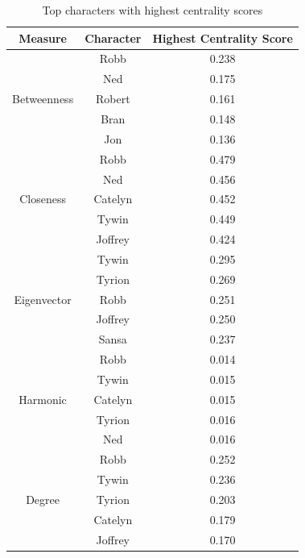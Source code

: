 \documentclass[10pt,twocolumn,letterpaper]{article}
\begin{document}
\begin{table}[!h]
    \centering
    \small
    \begin{tabular}{c|c|c}
        Measure & Character & \small{Highest Centrality Score} \\
        \hline
                    & Robb & 0.238 \\
                    & Ned & 0.175 \\
        Betweenness & Robert & 0.161 \\
                    & Bran & 0.148 \\
                    & Jon & 0.136 \\
        \hline 
                    & Robb & 0.479 \\
                    & Ned & 0.456 \\
        Closeness   & Catelyn & 0.452 \\
                    & Tywin & 0.449 \\
                    & Joffrey & 0.424 \\
        \hline 
                    & Tywin & 0.295 \\
                    & Tyrion & 0.269 \\
        Eigenvector & Robb & 0.251 \\
                    & Joffrey & 0.250 \\
                    & Sansa & 0.237 \\
        \hline 
                    & Robb & 0.014 \\
                    & Tywin & 0.015 \\
        Harmonic    & Catelyn & 0.015 \\
                    & Tyrion & 0.016 \\
                    & Ned & 0.016 \\
        \hline
                    & Robb & 0.252 \\
                    & Tywin & 0.236 \\
        Degree      & Tyrion & 0.203 \\
                    & Catelyn & 0.179 \\
                    & Joffrey & 0.170 \\
        \hline
    \end{tabular}
    \vspace{0.2cm}
    \caption{Top characters with highest centrality scores}
    \label{tab:my_label}
\end{table}
\end{document}
